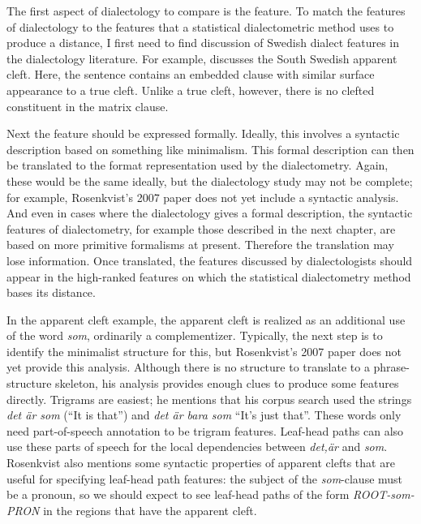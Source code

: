 The first aspect of dialectology to compare is the feature. To match the
features of dialectology to the features that a statistical
dialectometric method uses to produce a distance, I first need to find
discussion of Swedish dialect features in the dialectology
literature. For example,  discusses the South
Swedish apparent cleft. Here, the sentence contains an embedded clause
with similar surface appearance to a true cleft. Unlike a true cleft,
however, there is no clefted constituent in the matrix clause.


Next the feature should be expressed formally. Ideally, this involves
a syntactic description based on something like minimalism. This
formal description can then be translated to the format representation
used by the dialectometry. Again, these would be the same ideally, but
the dialectology study may not be complete; for example, Rosenkvist's
2007 paper does not yet include a syntactic analysis. And even in
cases where the dialectology gives a formal description, the syntactic
features of dialectometry, for example those described in the next
chapter, are based on more primitive formalisms at present. Therefore
the translation may lose information. Once translated, the features
discussed by dialectologists should appear in the high-ranked features
on which the statistical dialectometry method bases its distance.

In the apparent cleft example, the apparent cleft is realized as an
additional use of the word {\it som}, ordinarily a
complementizer. Typically, the next step is to identify the minimalist
structure for this, but Rosenkvist's 2007 paper does not yet provide
this analysis. Although there is no structure to translate to a
phrase-structure skeleton, his analysis provides enough clues to
produce some features directly. Trigrams are easiest; he mentions that
his corpus search used the strings {\it det \"ar som} (``It is that'')
and {\it det \"ar bara som} ``It's just that''. These words only need
part-of-speech annotation to be trigram features. Leaf-head
paths can also use these parts of speech for the local dependencies
between {\it det,\"ar} and {\it som}. Rosenkvist also mentions
some syntactic properties of apparent clefts that are useful for
specifying leaf-head path features: the subject of the {\it
  som}-clause must be a pronoun, so we should expect to see
leaf-head paths of the form {\it ROOT-som-PRON} in the regions that
have the apparent cleft.

